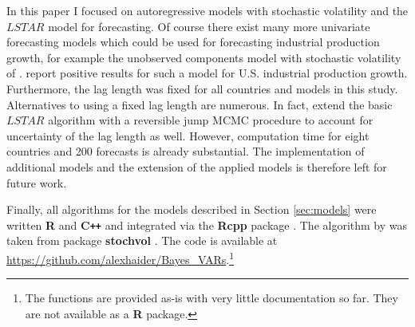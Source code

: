 \documentclass[12pt,letterpaper,fleqn]{article}           %
\begin{document}
In this paper I focused on autoregressive models with stochastic volatility and the $LSTAR$ model for forecasting. Of course there exist many more univariate forecasting models which could be used for forecasting industrial production growth, for example the unobserved components model with stochastic volatility of \textcite{stock07}. \textcite{bos10} report positive results for such a model for U.S. industrial production growth. Furthermore, the lag length was fixed for all countries and models in this study. Alternatives to using a fixed lag length are numerous. In fact, \textcite{lopes06} extend the basic $LSTAR$ algorithm with a reversible jump MCMC procedure to account for uncertainty of the lag length as well. However, computation time for eight countries and 200 forecasts is already substantial. The implementation of additional models and the extension of the applied models is therefore left for future work.
 
Finally, all algorithms for the models described in Section \ref{sec:models} were written \textbf{\textsf{R}} and \textbf{\textsf{C}\texttt{++}} and integrated via the \textbf{\textsf{Rcpp}} package \parencite{eddel11, eddel17}. The algorithm by \textcite{kastner14} was taken from package \textbf{\textsf{stochvol}} \parencite{kastner16}. %
The code is available at \url{https://github.com/alexhaider/Bayes_VARs}.\footnote{The functions are provided as-is with very little documentation so far. They are not available as a \textbf{\textsf{R}} package.}

\clearpage
\printbibliography




 



% 



\end{document}
